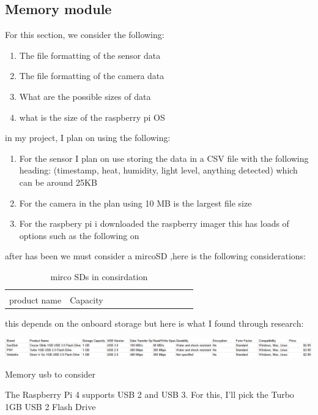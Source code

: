 \subsection{Memory module}
For this section, we consider the following:
\begin{enumerate}
	\item The file formatting of the sensor data
	\item The file formatting of  the camera data
	\item What are  the possible sizes of data
	\item what is the size of the  raspberry pi OS
\end{enumerate}
in my project, I plan on using the following:
\begin{enumerate}
	\item For the sensor I plan on use storing the data  in a  CSV file   with the following heading: (timestamp, heat, humidity, light level, anything detected) which can be around 25KB
	\item For the camera in the plan using 10 MB is the  largest file  size
	\item For the raspbery pi i downloaded  the raspberry imager  this has  loads of  options such as  the  following on \pageref{pi os}
\end{enumerate}
after has been we must consider a  mircoSD ,here is the following considerations:
\begin{table}
	\begin{tabular}{|c|c|c|c|c|c|c|c|c|c|c|c|}
		\hline \\
		product name & Capacity & 
		\hline
	\end{tabular}
	\caption{mirco SDs in consirdation}
	\label{mirco SDs in consirdation}
\end{table}
this depends on the onboard storage but here is what I found through research:
\begin{table}[h!]
	\centering
	\includegraphics[width=0.8\linewidth]{Images/memory_devices.png}
	\caption{Memory usb to consider}
	\label{Memory usb to consider}
\end{table}
The Raspberry Pi 4 supports USB 2 and  USB 3. For this, I'll pick the Turbo 1GB USB 2 Flash Drive

